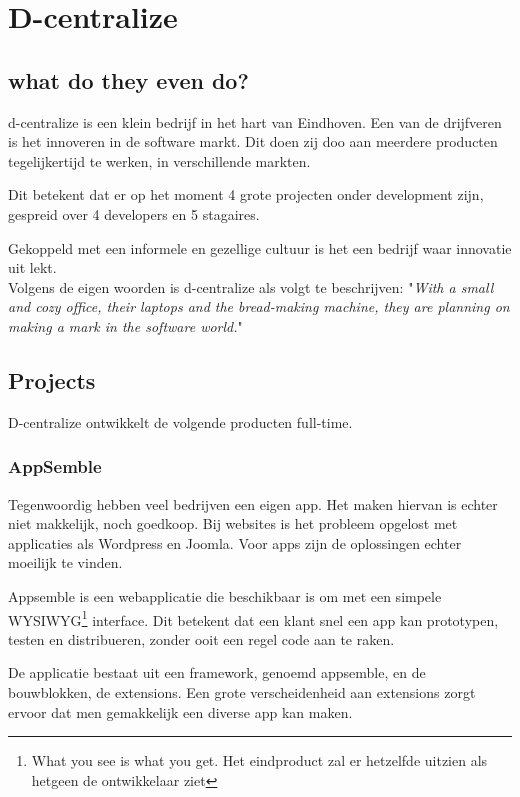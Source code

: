 \chapter{D-centralize}
\section{what do they even do?}
d-centralize is een klein bedrijf in het hart van Eindhoven. Een van de drijfveren is het innoveren in de software markt. Dit doen zij doo aan meerdere producten tegelijkertijd te werken, in verschillende markten.

Dit betekent dat er op het moment 4 grote projecten onder development zijn, gespreid over 4 developers en 5 stagaires.

Gekoppeld met een informele en gezellige cultuur is het een bedrijf waar innovatie uit lekt. \\

Volgens de eigen woorden is d-centralize als volgt te beschrijven: "\textit{With a small and cozy office, their laptops and the bread-making machine, they are planning on making a mark in the software world.}" \cite{dcent1}

\section{Projects}

D-centralize ontwikkelt de volgende producten full-time.

\subsection{AppSemble}

Tegenwoordig hebben veel bedrijven een eigen app. Het maken hiervan is echter niet makkelijk, noch goedkoop. Bij websites is het probleem opgelost met applicaties als Wordpress en Joomla. Voor apps zijn de oplossingen echter moeilijk te vinden. 

Appsemble is een webapplicatie die beschikbaar is om met een simpele WYSIWYG\footnote{What you see is what you get. Het eindproduct zal er hetzelfde uitzien als hetgeen de ontwikkelaar ziet} interface. Dit betekent dat een klant snel een app kan prototypen, testen en distribueren, zonder ooit een regel code aan te raken.

De applicatie bestaat uit een framework, genoemd appsemble, en de bouwblokken, de extensions. Een grote verscheidenheid aan extensions zorgt ervoor dat men gemakkelijk een diverse app kan maken.

